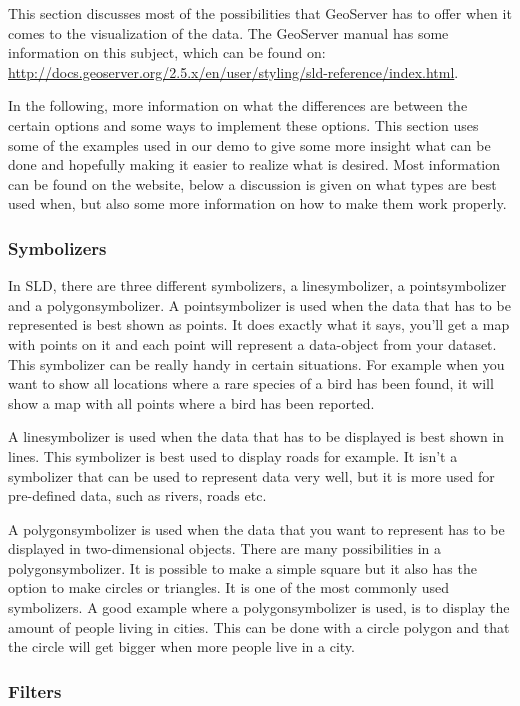 This section discusses most of the possibilities that GeoServer has to
offer when it comes to the visualization of the data. The GeoServer manual
has some information on this subject, which can be found on:
\url{http://docs.geoserver.org/2.5.x/en/user/styling/sld-reference/index.html}.

In the following, more information on what the differences are between the
certain options and some ways to implement these options. This section uses
some of the examples used in our demo to give some more insight what can be
done and hopefully making it easier to realize what is desired. Most
information can be found on the website, below a discussion is given on
what types are best used when, but also some more information on how to
make them work properly.

\subsubsection{Symbolizers}

In SLD, there are three different symbolizers, a linesymbolizer, a
pointsymbolizer and a polygonsymbolizer. A pointsymbolizer is used when the
data that has to be represented is best shown as points. It does exactly
what it says, you'll get a map with points on it and each point will
represent a data-object from your dataset. This symbolizer can be really
handy in certain situations. For example when you want to show all
locations where a rare species of a bird has been found, it will show a map
with all points where a bird has been reported.

A linesymbolizer is used when the data that has to be displayed is best
shown in lines. This symbolizer is best used to display roads for example.
It isn't a symbolizer that can be used to represent data very well, but it
is more used for pre-defined data, such as rivers, roads etc.

A polygonsymbolizer is used when the data that you want to represent has to
be displayed in two-dimensional objects. There are many possibilities in a
polygonsymbolizer. It is possible to make a simple square but it also has
the option to make circles or triangles. It is one of the most commonly
used symbolizers.  A good example where a polygonsymbolizer is used, is to
display the amount of people living in cities. This can be done with a
circle polygon and that the circle will get bigger when more people live in
a city.

\subsubsection{Filters}

